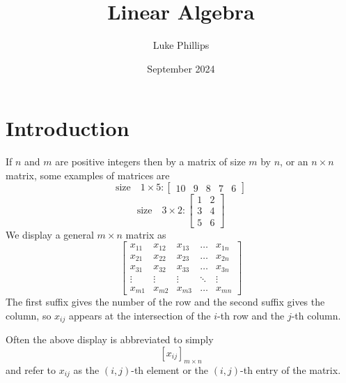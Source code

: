 \documentclass[10pt, a4paper]{article}
\title{Linear Algebra}
\author{Luke Phillips}
\date{September 2024}
\begin{document}
\maketitle

\section{Introduction}

If $n$ and $m$ are positive integers then by a matrix of size $m$ by $n$, or an $n \times n$ matrix, some examples of matrices are
\[
\text{size}\quad 1\times 5 : \begin{bmatrix} 10 & 9 & 8 & 7 & 6 \end{bmatrix}
\]
\[
\text{size}\quad 3\times 2 : \begin{bmatrix} 1 & 2 \\ 3 & 4 \\ 5 & 6 \end{bmatrix}
\]
We display a general $m \times n$ matrix as
\[
\begin{bmatrix}
    x_{11} & x_{12} & x_{13} & \dots & x_{1n} \\
    x_{21} & x_{22} & x_{23} & \dots & x_{2n} \\
    x_{31} & x_{32} & x_{33} & \dots & x_{3n} \\
    \vdots & \vdots & \vdots & \ddots & \vdots \\
    x_{m1} & x_{m2} & x_{m3} & \dots & x_{mn}
\end{bmatrix}
\]
The first suffix gives the number of the row and the second suffix gives the column, so $x_{ij}$ appears at the intersection of the $i$-th row and the $j$-th column. 

Often the above display is abbreviated to simply
\[
[x_{ij}]_{m\times n}
\]
and refer to $x_{ij}$ as the $(i, j)$-th element or the $(i, j)$-th entry of the matrix.
\end{document}
